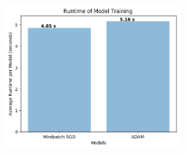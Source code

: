 \documentclass[10pt]{article}
\begin{document}
\begin{center}
    \includegraphics[width=0.5\textwidth]{train_time_part3.png}
\end{center}
\end{document}
